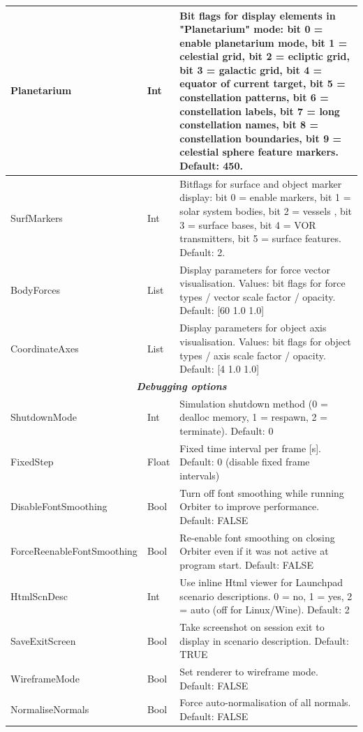 \documentclass[Orbiter User Manual.tex]{subfiles}
\begin{document}
\begin{longtable}{ |p{}|p{}|p{}| }
	\hline\rule{0pt}{2ex}
	Planetarium & Int & Bit flags for display elements in "Planetarium" mode: bit 0 = enable planetarium mode, bit 1 = celestial grid, bit 2 = ecliptic grid, bit 3 = galactic grid, bit 4 = equator of current target, bit 5 = constellation patterns, bit 6 = constellation labels, bit 7 = long constellation names, bit 8 = constellation boundaries, bit 9 = celestial sphere feature markers. Default: 450.\\
	\hline\rule{0pt}{2ex}
	SurfMarkers & Int & Bitflags for surface and object marker display: bit 0 = enable markers,  bit 1 = solar system bodies, bit 2 = vessels , bit 3 = surface bases, bit 4 = VOR transmitters, bit 5 = surface features. Default: 2.\\
	\hline\rule{0pt}{2ex}
	BodyForces & List & Display parameters for force vector visualisation. Values: bit flags for force types / vector scale factor / opacity. Default: [60 1.0 1.0]\\
	\hline\rule{0pt}{2ex}
	CoordinateAxes & List & Display parameters for object axis visualisation. Values: bit flags for object types / axis scale factor / opacity. Default: [4 1.0 1.0]\\
	\hline
	\multicolumn{3}{|c|}{\rule{0pt}{2ex}\textbf{\textit{Debugging options}}}\\
	\hline\rule{0pt}{2ex}
	ShutdownMode & Int & Simulation shutdown method (0 = dealloc memory, 1 = respawn, 2 = terminate). Default: 0\\
	\hline\rule{0pt}{2ex}
	FixedStep & Float & Fixed time interval per frame [s]. Default: 0 (disable fixed frame intervals)\\
	\hline\rule{0pt}{2ex}
	DisableFontSmoothing & Bool & Turn off font smoothing while running Orbiter to improve performance. Default: FALSE\\
	\hline\rule{0pt}{2ex}
	ForceReenableFontSmoothing & Bool & Re-enable font smoothing on closing Orbiter even if it was not active at program start. Default: FALSE\\
	\hline\rule{0pt}{2ex}
	HtmlScnDesc & Int & Use inline Html viewer for Launchpad scenario descriptions. 0 = no, 1 = yes, 2 = auto (off for Linux/Wine). Default: 2\\
	\hline\rule{0pt}{2ex}
	SaveExitScreen & Bool & Take screenshot on session exit to display in scenario description. Default: TRUE\\
	\hline\rule{0pt}{2ex}
	WireframeMode & Bool & Set renderer to wireframe mode. Default: FALSE\\
	\hline\rule{0pt}{2ex}
	NormaliseNormals & Bool & Force auto-normalisation of all normals. Default: FALSE\\

\end{longtable}
\end{document}
